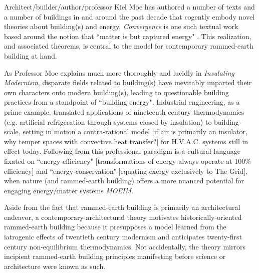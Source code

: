 
Architect/builder/author/professor Kiel Moe has authored a number of texts and a number of buildings in and around the past decade that cogently embody novel theories about building(s) and energy. \textit{Convergence} is one such textual work based around the notion that ``matter is but captured energy" \cite{MOECONVERGENCE}. This realization, and associated theorems, is central to the model for contemporary rammed-earth building at hand.

As Professor Moe explains much more thoroughly and lucidly in \textit{Insulating Modernism}, disparate fields related to building(s) have inevitably imparted their own characters onto modern building(s), leading to questionable building practices from a standpoint of ``building energy". Industrial engineering, as a prime example, translated applications of nineteenth century thermodynamics (e.g. artificial refrigeration through systems closed by insulation) to building-scale, setting in motion a contra-rational model [if air is primarily an insulator, why temper spaces with convective heat transfer?] for H.V.A.C. systems still in effect today. Following from this professional paradigm is a cultural language fixated on ``energy-efficiency" [transformations of energy always operate at 100\% efficiency] and ``energy-conservation" [equating exergy exclusively to The Grid], when nature (and rammed-earth building) offers a more nuanced potential for engaging energy/matter systems \textit{MOEIM}.

Aside from the fact that rammed-earth building is primarily an architectural endeavor, a contemporary architectural theory motivates historically-oriented rammed-earth building because it presupposes a model learned from the iatrogenic effects of twentieth century modernism and anticipates twenty-first century non-equilibrium thermodynamics. Not accidentally, the theory mirrors incipient rammed-earth building principles manifesting before science or architecture were known as such.


